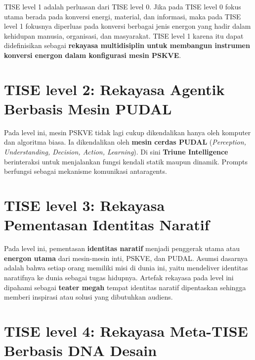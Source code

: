\documentclass[
  letterpaper,
  DIV=11,
  numbers=noendperiod]{scrreprt}
\begin{document}
TISE level 1 adalah perluasan dari TISE level 0. Jika pada TISE level 0
fokus utama berada pada konversi energi, material, dan informasi, maka
pada TISE level 1 fokusnya diperluas pada konversi berbagai jenis
energon yang hadir dalam kehidupan manusia, organisasi, dan masyarakat.
TISE level 1 karena itu dapat didefinisikan sebagai \textbf{rekayasa
multidisiplin untuk membangun instrumen konversi energon dalam
konfigurasi mesin PSKVE}.

\section*{TISE level 2: Rekayasa Agentik Berbasis Mesin
PUDAL}\label{tise-level-2-rekayasa-agentik-berbasis-mesin-pudal}


Pada level ini, mesin PSKVE tidak lagi cukup dikendalikan hanya oleh
komputer dan algoritma biasa. Ia dikendalikan oleh \textbf{mesin cerdas
PUDAL} (\emph{Perception, Understanding, Decision, Action, Learning}).
Di sini \textbf{Triune Intelligence} berinteraksi untuk menjalankan
fungsi kendali statik maupun dinamik. Prompts berfungsi sebagai
mekanisme komunikasi antaragents.

\section*{TISE level 3: Rekayasa Pementasan Identitas
Naratif}\label{tise-level-3-rekayasa-pementasan-identitas-naratif}


Pada level ini, pementasan \textbf{identitas naratif} menjadi penggerak
utama atau \textbf{energon utama} dari mesin-mesin inti, PSKVE, dan
PUDAL. Asumsi dasarnya adalah bahwa setiap orang memiliki misi di dunia
ini, yaitu mendeliver identitas naratifnya ke dunia sebagai tugas
hidupnya. Artefak rekayasa pada level ini dipahami sebagai
\textbf{teater megah} tempat identitas naratif dipentaskan sehingga
memberi inspirasi atau solusi yang dibutuhkan audiens.

\section*{TISE level 4: Rekayasa Meta-TISE Berbasis DNA
Desain}\label{tise-level-4-rekayasa-meta-tise-berbasis-dna-desain}
\end{document}
